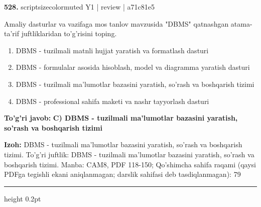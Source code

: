 \documentclass[10pt,a4paper]{article}
\begin{document}
{\bfseries\sffamily\color{ink} 528.} {scriptsizecolor{muted} Y1 | review | a71c81e5}
\par
Amaliy dasturlar va vazifaga mos tanlov mavzusida "DBMS" qatnashgan atama-ta'rif juftliklaridan to'g'risini toping.
\begin{enumerate}[label=\Alph*),leftmargin=9mm]
\item DBMS - tuzilmali matnli hujjat yaratish va formatlash dasturi
\item DBMS - formulalar asosida hisoblash, model va diagramma yaratish dasturi
\item DBMS - tuzilmali ma'lumotlar bazasini yaratish, so'rash va boshqarish tizimi
\item DBMS - professional sahifa maketi va nashr tayyorlash dasturi
\end{enumerate}
\begin{tcolorbox}[enhanced,breakable,colback=teal!4,colframe=teal!60!black,boxrule=0.45pt,arc=1.2mm,left=2.7mm,right=2.7mm,top=1.8mm,bottom=1.8mm,before skip=2mm,after skip=2mm]
{\bfseries\sffamily\color{teal}To'g'ri javob:} \textbf{C) DBMS - tuzilmali ma'lumotlar bazasini yaratish, so'rash va boshqarish tizimi}
\par\smallskip
{\bfseries Izoh:} DBMS - tuzilmali ma'lumotlar bazasini yaratish, so'rash va boshqarish tizimi. To'g'ri juftlik: DBMS - tuzilmali ma'lumotlar bazasini yaratish, so'rash va boshqarish tizimi. Manba: CAM8, PDF 118-150; Qo'shimcha sahifa raqami (qaysi PDFga tegishli ekani aniqlanmagan; darslik sahifasi deb tasdiqlanmagan): 79
\end{tcolorbox}
\vspace{2mm}\hrule height 0.2pt\vspace{3mm}
\end{document}
